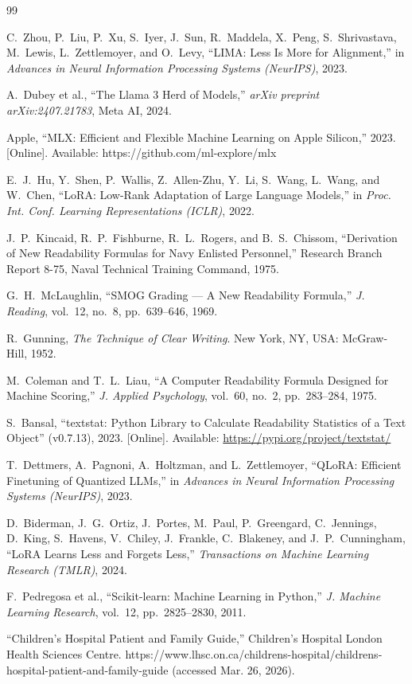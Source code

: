 \documentclass[journal]{IEEEtai}
\begin{document}
\begin{thebibliography}{99}

C.~Zhou, P.~Liu, P.~Xu, S.~Iyer, J.~Sun, R.~Maddela, X.~Peng, S.~Shrivastava, M.~Lewis, L.~Zettlemoyer, and O.~Levy, ``LIMA: Less Is More for Alignment,'' in \textit{Advances in Neural Information Processing Systems (NeurIPS)}, 2023.

A.~Dubey et al., ``The Llama 3 Herd of Models,'' \textit{arXiv preprint arXiv:2407.21783}, Meta AI, 2024.

Apple, ``MLX: Efficient and Flexible Machine Learning on Apple Silicon,'' 2023. [Online]. Available: https://github.com/ml-explore/mlx

E.~J.~Hu, Y.~Shen, P.~Wallis, Z.~Allen-Zhu, Y.~Li, S.~Wang, L.~Wang, and W.~Chen, ``LoRA: Low-Rank Adaptation of Large Language Models,'' in \textit{Proc. Int. Conf. Learning Representations (ICLR)}, 2022.

J.~P.~Kincaid, R.~P.~Fishburne, R.~L.~Rogers, and B.~S.~Chissom, ``Derivation of New Readability Formulas for Navy Enlisted Personnel,'' Research Branch Report 8-75, Naval Technical Training Command, 1975.

G.~H.~McLaughlin, ``SMOG Grading --- A New Readability Formula,'' \textit{J. Reading}, vol.~12, no.~8, pp.~639--646, 1969.

R.~Gunning, \textit{The Technique of Clear Writing}. New York, NY, USA: McGraw-Hill, 1952.

M.~Coleman and T.~L.~Liau, ``A Computer Readability Formula Designed for Machine Scoring,'' \textit{J. Applied Psychology}, vol.~60, no.~2, pp.~283--284, 1975.

S.~Bansal, ``textstat: Python Library to Calculate Readability Statistics of a Text Object'' (v0.7.13), 2023. [Online]. Available: \url{https://pypi.org/project/textstat/}

T.~Dettmers, A.~Pagnoni, A.~Holtzman, and L.~Zettlemoyer, ``QLoRA: Efficient Finetuning of Quantized LLMs,'' in \textit{Advances in Neural Information Processing Systems (NeurIPS)}, 2023.

D.~Biderman, J.~G.~Ortiz, J.~Portes, M.~Paul, P.~Greengard, C.~Jennings, D.~King, S.~Havens, V.~Chiley, J.~Frankle, C.~Blakeney, and J.~P.~Cunningham, ``LoRA Learns Less and Forgets Less,'' \textit{Transactions on Machine Learning Research (TMLR)}, 2024.

F.~Pedregosa et al., ``Scikit-learn: Machine Learning in Python,'' \textit{J. Machine Learning Research}, vol.~12, pp.~2825--2830, 2011.

“Children's Hospital Patient and Family Guide,” Children's Hospital London Health Sciences Centre. https://www.lhsc.on.ca/childrens-hospital/childrens-hospital-patient-and-family-guide (accessed Mar. 26, 2026).

\end{thebibliography}
\end{document}

